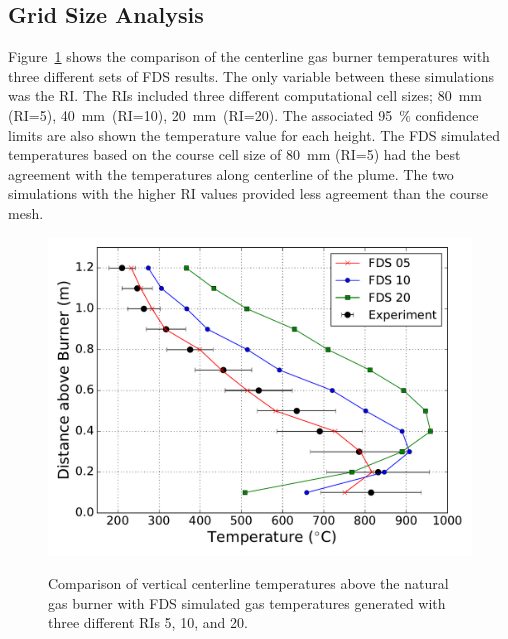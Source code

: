\documentclass[twoside]{uocthesis}
\begin{document}
{\subsection{Grid Size Analysis}
Figure~\ref{FHNG01_RI} shows the comparison of the centerline gas burner temperatures with three different sets of FDS results.  The only variable between these simulations was the RI. The RIs included three different computational cell sizes; 80~mm (RI=5), 40~mm~(RI=10), 20~mm~(RI=20).  The associated 95~\% confidence limits are also shown the temperature value for each height.  The FDS simulated temperatures based on the course cell size of 80~mm (RI=5) had the best agreement with the temperatures along centerline of the plume.  The two simulations with the higher RI values provided less agreement than the course mesh.  

\begin{figure}[h!]
	\includegraphics[width=5in]{../Figures/FHNG01_RI} \\
	\caption[Comparison of vertical centerline temperatures above the natural gas burner with FDS simulated gas temperatures.]{Comparison of vertical centerline temperatures above the natural gas burner with FDS simulated gas temperatures generated with three different RIs 5, 10, and 20.}
	\label{FHNG01_RI}
\end{figure}

}
\end{document}
